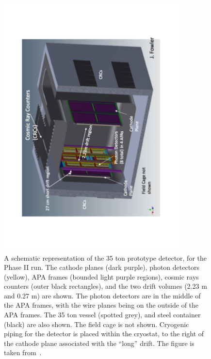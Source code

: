 \begin{figure}
  \centering
  \includegraphics[width=0.85\textwidth]{35tonSchem}
  \caption[A schematic representation of the 35 ton prototype detector, for the Phase II run]
          {A schematic representation of the 35 ton prototype detector, for the Phase II run. The cathode planes (dark purple), photon detectors (yellow), APA frames (bounded light purple regions), cosmic rays counters (outer black rectangles), and the two drift volumes (2.23 m and 0.27 m) are shown. The photon detectors are in the middle of the APA frames, with the wire planes being on the outside of the APA frames. The 35 ton vessel (spotted grey), and steel container (black) are also shown. The field cage is not shown. Cryogenic piping for the detector is placed within the cryostat, to the right of the cathode plane associated with the ``long'' drift. The figure is taken from~\citep{DUNECDR_V4}.}
  \label{fig:35tonSchem}
\end{figure}

